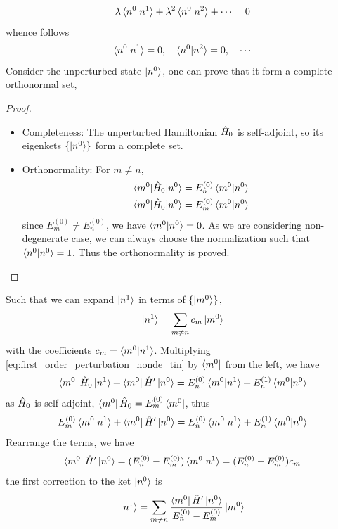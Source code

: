 \begin{align*}
    \lambda \braket{n^0| n^1} + \lambda^2 \braket{n^0|n^2} + \dots = 0
\end{align*}
whence follows 
\begin{align}
    \braket{n^0 | n^1} = 0, \quad \braket{n^0 | n^2} = 0, \quad \cdots
\end{align}
Consider the unperturbed state $\ket{n^0}$, one can prove that it form a complete orthonormal set, 
\begin{proof}
    \begin{itemize}
        \item Completeness: The unperturbed Hamiltonian $\hat{H}_0$ is self-adjoint, so its eigenkets $\{\ket{n^0}\}$ form a complete set. 
        \item Orthonormality: For $m \neq n$, 
        \begin{align*}
            \braket{m^0|\hat{H}_0|n^0} = E_n^{(0)} \braket{m^0|n^0} \\
            \braket{m^0|\hat{H}_0|n^0} = E_m^{(0)} \braket{m^0|n^0}
        \end{align*}
        since $E_m^{(0)} \neq E_n^{(0)}$, we have $\braket{m^0|n^0} = 0$. As we are considering non-degenerate case, we can always choose the normalization such that $\braket{n^0|n^0} = 1$. Thus the orthonormality is proved.
    \end{itemize}
\end{proof}
Such that we can expand $\ket{n^1}$ in terms of $\{\ket{m^0}\}$,
\begin{align}
    \ket{n^1} = \sum_{m \neq n} c_m \ket{m^0}
\end{align}
with the coefficients $c_m = \braket{m^0|n^1}$. Multiplying \eqref{eq:first_order_perturbation_nonde_tin} by $\bra{m^0}$ from the left, we have 
\begin{align*}
    \bra{m^0} \hat{H}_0 \ket{n^1} + \bra{m^0} \hat{H}' \ket{n^0} = E_n^{(0)} \braket{m^0|n^1} + E_n^{(1)} \braket{m^0|n^0}
\end{align*}
as $\hat{H}_0$ is self-adjoint, $\bra{m^0} \hat{H}_0 = E_m^{(0)} \bra{m^0}$, thus
\begin{align*}
    E_m^{(0)} \braket{m^0|n^1} + \bra{m^0} \hat{H}' \ket{n^0} = E_n^{(0)} \braket{m^0|n^1} + E_n^{(1)} \braket{m^0|n^0}
\end{align*}
Rearrange the terms, we have 
\begin{align}
    \bra{m^0} \hat{H}' \ket{n^0} = (E_n^{(0)} - E_m^{(0)}) \braket{m^0|n^1} = (E_n^{(0)} - E_m^{(0)}) c_m
\end{align}
the first correction to the ket $\ket{n^0}$ is 
\begin{align}
    \ket{n^1} = \sum_{m \neq n} \frac{\bra{m^0} \hat{H}' \ket{n^0}}{E_n^{(0)} - E_m^{(0)}} \ket{m^0}
\end{align}

